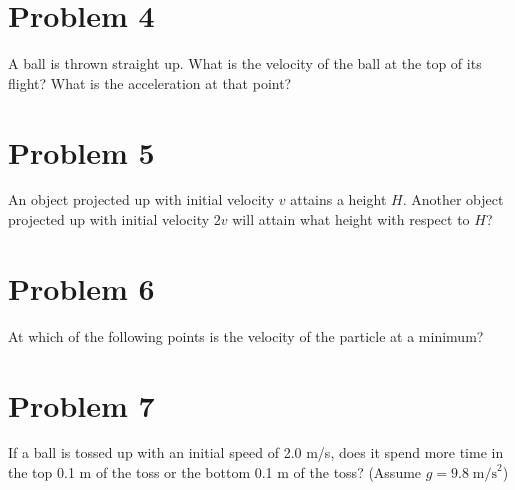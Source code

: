 \documentclass[tikz,border=10pt]{article}
\begin{document}
\section*{Problem 4}

A ball is thrown straight up. What is the velocity of the ball at the top of its flight? What is the acceleration at that point?

\section*{Problem 5}

An object projected up with initial velocity $v$ attains a height $H$. Another object projected up with initial velocity $2v$ will attain what height with respect to $H$?

\section*{Problem 6}

At which of the following points is the velocity of the particle at a minimum?

\begin{center}
\end{center}

\section*{Problem 7}

If a ball is tossed up with an initial speed of 2.0 m/s, does it spend more time in the top 0.1 m of the toss or the bottom 0.1 m of the toss? (Assume $g = 9.8\;\text{m/s}^{2}$)
\end{document}
